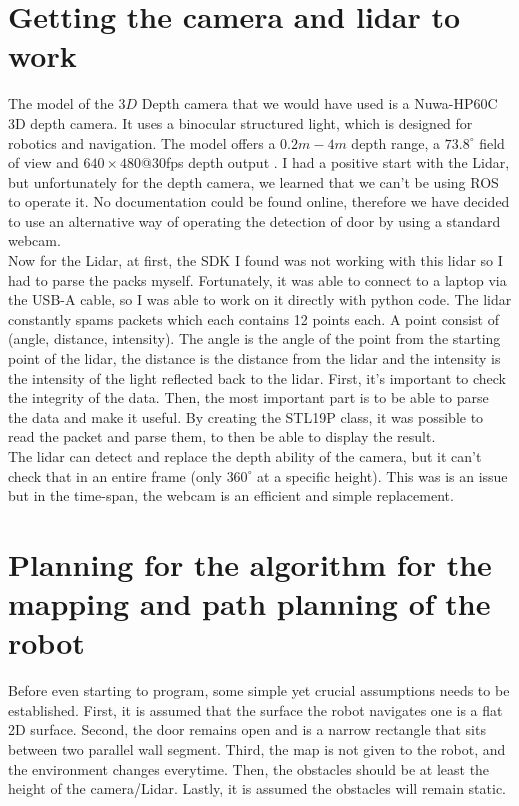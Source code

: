 \documentclass{article}
\begin{document}
\section{Getting the camera and lidar to work}

The model of the $3D$ Depth camera that we would have used is a Nuwa-HP60C 3D depth camera. It uses a binocular structured light, which is designed for robotics and navigation. The model offers a $0.2m-4m$ depth range, a $73.8^\circ$ field of view and $640\times480$@$30$fps depth output \cite{RobotShop_Yahboom_Nuwa}. 
I had a positive start with the Lidar, but unfortunately for the depth camera, we learned that we can't be using ROS to operate it. No documentation could be found online, therefore we have decided to use an alternative way of operating the detection of door by using a standard webcam. \\

Now for the Lidar, at first, the SDK I found was not working with this lidar so I had to parse the packs myself. Fortunately, it was able to connect to a laptop via the USB-A cable, so I was able to work on it directly with python code. The lidar constantly spams packets which each contains 12 points each. A point consist of (angle, distance, intensity). The angle is the angle of the point from the starting point of the lidar, the distance is the distance from the lidar and the intensity is the intensity of the light reflected back to the lidar. First, it's important to check the integrity of the data. Then, the most important part is to be able to parse the data and make it useful. By creating the STL19P class, it was possible to read the packet and parse them, to then be able to display the result.\\

The lidar can detect and replace the depth ability of the camera, but it can't check that in an entire frame (only $360^\circ$ at a specific height). This was is an issue but in the time-span, the webcam is an efficient and simple replacement. 



\section{Planning for the algorithm for the mapping and path planning of the robot}

Before even starting to program, some simple yet crucial assumptions needs to be established. First, it is assumed that the surface the robot navigates one is a flat 2D surface. Second, the door remains open and is a narrow rectangle that sits between two parallel wall segment. Third, the map is not given to the robot, and the environment changes everytime. Then, the obstacles should be at least the height of the camera/Lidar. Lastly, it is assumed the obstacles will remain static. \\
\end{document}
